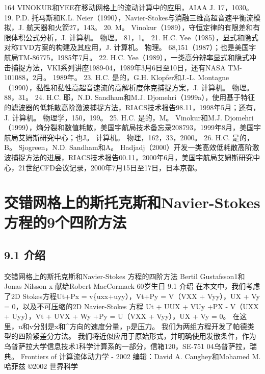 \documentclass[UTF8,11pt,a4paper,openany,fontset=fandol]{ctexbook}
\begin{document}
164 VINOKUR和YEE在移动网格上的流动计算中的应用，AIAA J. 17，1030。 19. P.D. 托马斯和K.L. Neier（1990），Navier-Stokes与消融三维高超音速平衡流模拟，J. 航天器和火箭27，143。 20. M。 Vinokur（1989），守恒定律的有限差和有限体积公式分析，J. 计算机。 物理。 81，1。 21. H.C. Yee（1985），显式和隐式对称TVD方案的构建及其应用，J. 计算机。 物理。 68,151（1987）；也是美国宇航局TM-86775，1985年7月。 22. H.C. Yee（1989），一类高分辨率显式和隐式冲击捕捉方法，VKI系列讲座1989-04，1989年3月6日至10日，还有NASA TM-101088，2月。 1989年。 23. H.C. 是的，G.H. Klopfer和J.-L. Montagne（1990），黏性和黏性高超音速流的高解析度休克捕捉方案，J. 计算机。 物理。 88，31。 24. H.C. 耶，N.D. Sandham和M.J. Djomehri（1999a），使用基于特征的滤波器的低耗散高阶激波捕捉方法，RIACS技术报告98.11，1998年5月；还有，J. 计算机。 物理学，150，199。 25. H.C. 是的，M。 Vinokur和M.J. Djomehri（1999），熵分裂和数值耗散，美国宇航局技术备忘录208793，1999年8月，美国宇航局艾姆斯研究中心；也J。 计算机。 物理，162，33，2000。 26. H.C. 是的，B。 Sjogreen，N.D. Sandham和A。 Hadjadj（2000）开发一类高效低耗散高阶激波捕捉方法的进展，RIACS技术报告00.11，2000年6月，美国宇航局艾姆斯研究中心，21世纪CFD会议记录，2000年7月15日至17日，日本京都。

\clearpage
\chapter{交错网格上的斯托克斯和Navier-Stokes 方程的9个四阶方法}
\section{9.1 介绍}
交错网格上的斯托克斯和Navier-Stokes 方程的四阶方法 Bertil Gustafsson1和Jonas Nilsson x 献给Robert MacCormack 60岁生日 9.1 介绍 在本文中，我们考虑了2D Stokes方程Ut+Px = v\{uxx+uyy），Vt+Py = V（VXX + Vyy），UX + Vy = 0，以及不可压缩的2D Navier-Stokes 方程 Ut + UUX + VUy +PX - V（UXX + Uyy），Vt + UVX + Wy +Py = U（VXX + Vyy），UX + Vy = 0。 在这里，u和v分别是x和\textasciicircum{}方向的速度分量，p是压力。 我们为两组方程开发了帕德类型的四阶紧差分方法。 我们将近似应用于原始形式，并明确使用发散条件，作为乌普萨拉大学信息技术1科学计算系的一部分，信箱120，SE-751 04乌普萨拉，瑞典。 Frontiers of 计算流体动力学 - 2002 编辑：David A. Caughey和Mohamed M. 哈菲兹 ©2002 世界科学
\end{document}

